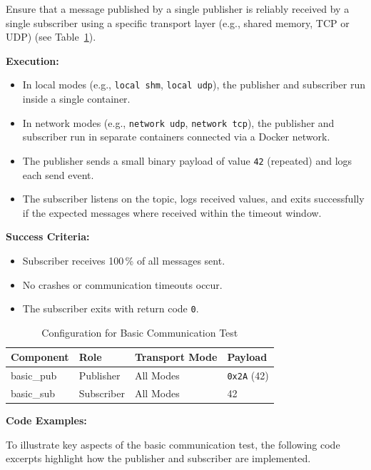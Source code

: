 \vspace{0.4em}
Ensure that a message published by a single publisher is reliably received by a single subscriber using a specific transport layer (e.g., shared memory, TCP or UDP) (see Table~\ref{tab:basic_comm_test}).

\vspace{0.5em}
\textbf{Execution:}
\begin{itemize}
	\item In local modes (e.g., \texttt{local shm}, \texttt{local udp}), the publisher and subscriber run inside a single container.
	\item In network modes (e.g., \texttt{network udp}, \texttt{network tcp}), the publisher and subscriber run in separate containers connected via a Docker network.
	\item The publisher sends a small binary payload of value \texttt{42} (repeated) and logs each send event.
	\item The subscriber listens on the topic, logs received values, and exits successfully if the expected messages where received within the timeout window.
\end{itemize}

\textbf{Success Criteria:}
\begin{itemize}
	\item Subscriber receives 100\,\% of all messages sent.
	\item No crashes or communication timeouts occur.
	\item The subscriber exits with return code \texttt{0}.
\end{itemize}

\begin{table}[H]
	\centering
	\begin{tabular}{@{}llll@{}}
		\toprule
		\textbf{Component} & \textbf{Role} & \textbf{Transport Mode} & \textbf{Payload} \\
		\midrule
		basic\_pub  & Publisher  & All Modes  & \texttt{0x2A} (42) \\
		basic\_sub  & Subscriber & All Modes  & 42 \\
		\bottomrule
	\end{tabular}
	\caption{Configuration for Basic Communication Test}
	\captionsetup{position=bottom}
	\label{tab:basic_comm_test}
\end{table}


\textbf{Code Examples:}

\vspace{0.4em}
To illustrate key aspects of the basic communication test, the following code excerpts highlight how the publisher and subscriber are implemented.

